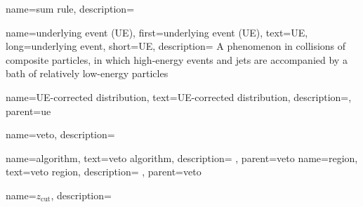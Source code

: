 {
  name=sum rule,
  description={}
}


{
  name=underlying event (UE),
  first=underlying event (UE),
  text=UE,
  long=underlying event,
  short=UE,
  description={
      A phenomenon in collisions of composite particles, in which high-energy events and jets are accompanied by a bath of relatively low-energy particles
  }
}

{
    name=UE-corrected distribution,
    text=UE-corrected distribution,
    description={},
    parent=ue
}


{
    name=veto,
    description={}
}

{
    name=algorithm,
    text=veto algorithm,
    description={
    },
    parent=veto
}
{
    name=region,
    text=veto region,
    description={
    },
    parent=veto
}

{
  name=\ensuremath{z_{\text{cut}}},
  description={}
}
